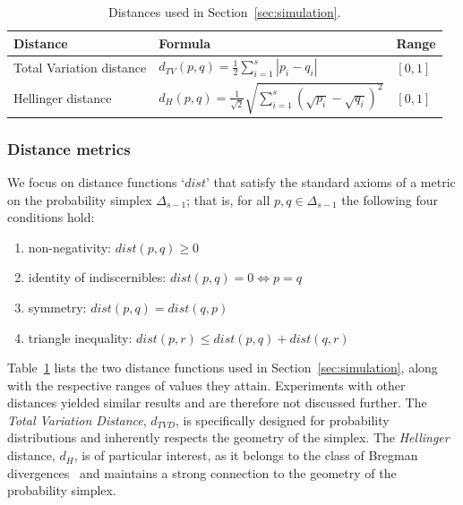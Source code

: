 \documentclass[preprint,12pt]{elsarticle}
\begin{document}
\begin{table}[t]
\small
\renewcommand{\arraystretch}{1.2} 
\centering
\caption{Distances used in Section~\ref{sec:simulation}.}
\label{tab:distance_functions}
\begin{tabular}{l l l}
\toprule
Distance & Formula & Range \\
\midrule
Total Variation distance & 
$d_{TV}(p,q) = \frac{1}{2} \sum_{i=1}^s |p_i - q_i|$ & 
$[0, 1]$ \\ 
Hellinger distance & 
$d_{H}(p,q) = \frac{1}{\sqrt{2}} \sqrt{\sum_{i=1}^s \left( \sqrt{p_i} - \sqrt{q_i} \right)^2}$ & 
$[0, 1]$ \\ 
\bottomrule
\end{tabular}
\end{table}



\subsubsection{Distance metrics}
We focus on distance functions `${dist}$' that satisfy the standard axioms of a metric on the probability simplex $\Delta_{s-1}$; that is, for all $p,q\in \Delta_{s-1}$ the following four conditions hold:

\begin{enumerate}
    \item {non-negativity}:
    \(
    {dist}(p, q) \geq 0
    \)
    \item {identity of indiscernibles}:
    \(
    {dist}(p, q) = 0 \iff p = q
    \)
    \item {symmetry}:
    \(
    {dist}(p, q) = {dist}(q, p)
    \)
    \item {triangle inequality}:
    \(
    {dist}(p, r) \leq {dist}(p, q) + {dist}(q, r)
    \)
\end{enumerate}

Table~\ref{tab:distance_functions} lists the two distance functions used in Section~\ref{sec:simulation}, along with the respective ranges of values they attain. 
 Experiments with other distances yielded similar results and are therefore not discussed further. 
The \textit{Total Variation Distance}, $d_{TVD}$, is specifically designed for probability distributions and inherently respects the geometry of the simplex. The \textit{Hellinger} distance, $d_{H}$, is of particular interest, as it belongs to the class of Bregman divergences~\cite{bregman1967relaxation}  and maintains a strong connection to the geometry of the probability simplex.
\end{document}
